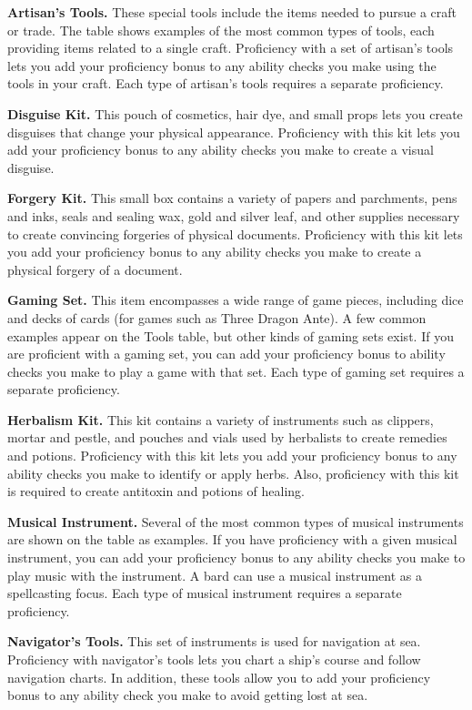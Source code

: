 \documentclass[
]{article}
\begin{document}
\textbf{Artisan's Tools.} These special tools include the items needed
to pursue a craft or trade. The table shows examples of the most common
types of tools, each providing items related to a single craft.
Proficiency with a set of artisan's tools lets you add your proficiency
bonus to any ability checks you make using the tools in your craft. Each
type of artisan's tools requires a separate proficiency.

\textbf{Disguise Kit.} This pouch of cosmetics, hair dye, and small
props lets you create disguises that change your physical appearance.
Proficiency with this kit lets you add your proficiency bonus to any
ability checks you make to create a visual disguise.

\textbf{Forgery Kit.} This small box contains a variety of papers and
parchments, pens and inks, seals and sealing wax, gold and silver leaf,
and other supplies necessary to create convincing forgeries of physical
documents. Proficiency with this kit lets you add your proficiency bonus
to any ability checks you make to create a physical forgery of a
document.

\textbf{Gaming Set.} This item encompasses a wide range of game pieces,
including dice and decks of cards (for games such as Three Dragon Ante).
A few common examples appear on the Tools table, but other kinds of
gaming sets exist. If you are proficient with a gaming set, you can add
your proficiency bonus to ability checks you make to play a game with
that set. Each type of gaming set requires a separate proficiency.

\textbf{Herbalism Kit.} This kit contains a variety of instruments such
as clippers, mortar and pestle, and pouches and vials used by herbalists
to create remedies and potions. Proficiency with this kit lets you add
your proficiency bonus to any ability checks you make to identify or
apply herbs. Also, proficiency with this kit is required to create
antitoxin and potions of healing.

\textbf{Musical Instrument.} Several of the most common types of musical
instruments are shown on the table as examples. If you have proficiency
with a given musical instrument, you can add your proficiency bonus to
any ability checks you make to play music with the instrument. A bard
can use a musical instrument as a spellcasting focus. Each type of
musical instrument requires a separate proficiency.

\textbf{Navigator's Tools.} This set of instruments is used for
navigation at sea. Proficiency with navigator's tools lets you chart a
ship's course and follow navigation charts. In addition, these tools
allow you to add your proficiency bonus to any ability check you make to
avoid getting lost at sea.
\end{document}
